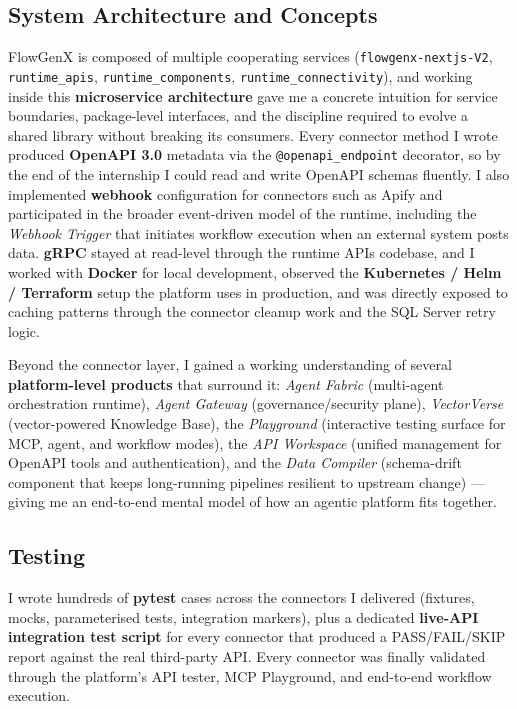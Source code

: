 \subsection{System Architecture and Concepts}
FlowGenX is composed of multiple cooperating services
(\texttt{flowgenx-nextjs-V2}, \texttt{runtime\_apis},
\texttt{runtime\_components}, \texttt{runtime\_connectivity}), and
working inside this \textbf{microservice architecture} gave me a
concrete intuition for service boundaries, package-level
interfaces, and the discipline required to evolve a shared library
without breaking its consumers. Every connector method I wrote
produced \textbf{OpenAPI 3.0} metadata via the
\texttt{@openapi\_endpoint} decorator, so by the end of the
internship I could read and write OpenAPI schemas fluently. I also
implemented \textbf{webhook} configuration for connectors such as
Apify and participated in the broader event-driven model of the
runtime, including the \emph{Webhook Trigger} that initiates
workflow execution when an external system posts data. \textbf{gRPC}
stayed at read-level through the runtime APIs codebase, and I
worked with \textbf{Docker} for local development, observed the
\textbf{Kubernetes / Helm / Terraform} setup the platform uses in
production, and was directly exposed to caching patterns through
the connector cleanup work and the SQL Server retry logic.

Beyond the connector layer, I gained a working understanding of
several \textbf{platform-level products} that surround it:
\emph{Agent Fabric} (multi-agent orchestration runtime),
\emph{Agent Gateway} (governance/security plane), \emph{VectorVerse}
(vector-powered Knowledge Base), the \emph{Playground} (interactive
testing surface for MCP, agent, and workflow modes), the \emph{API
Workspace} (unified management for OpenAPI tools and
authentication), and the \emph{Data Compiler} (schema-drift
component that keeps long-running pipelines resilient to upstream
change) --- giving me an end-to-end mental model of how an agentic
platform fits together.

\subsection{Testing}
I wrote hundreds of \textbf{pytest} cases across the connectors I
delivered (fixtures, mocks, parameterised tests, integration
markers), plus a dedicated \textbf{live-API integration test
script} for every connector that produced a
\textsc{PASS}/\textsc{FAIL}/\textsc{SKIP} report against the real
third-party API. Every connector was finally validated through
the platform's API tester, MCP Playground, and end-to-end workflow
execution.

